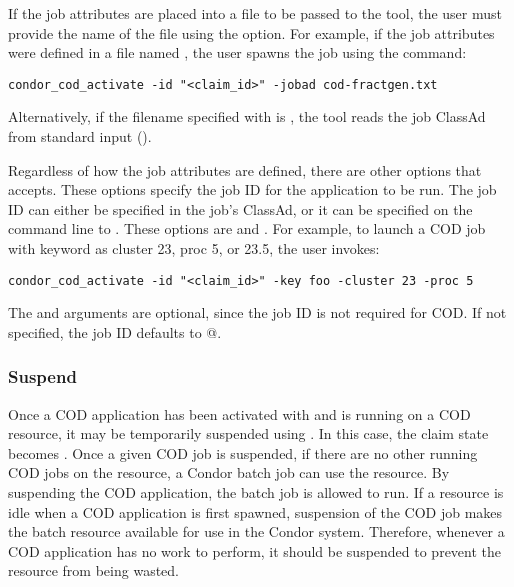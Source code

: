 If the job attributes are placed into a file to be passed to the
 tool,
the user must provide the
name of the file using the  option.
For example, if the job attributes were defined in a file named
, the user spawns the job using the
command:
\begin{verbatim}
condor_cod_activate -id "<claim_id>" -jobad cod-fractgen.txt
\end{verbatim}
Alternatively, if the filename specified with  is
\File{-}, the  tool reads the job ClassAd from
standard input ().

Regardless of how the job attributes are defined, there are
other options that  accepts.
These options specify the job ID for the application to be run.
The job ID can either be specified in the job's ClassAd, 
or it can be
specified on the command line to .
These options are  and .
For example, to launch a COD job with keyword \verb@foo@
as cluster 23, proc 5, or 23.5,
the user invokes:
\begin{verbatim}
condor_cod_activate -id "<claim_id>" -key foo -cluster 23 -proc 5
\end{verbatim}
The  and  arguments are optional,
since the job ID is not required for COD.
If not specified, the job ID defaults to @.


\subsubsection{\label{sec:cod-claim-suspend}Suspend}

Once a COD application has been activated with 
and is running on a COD resource, it may be temporarily suspended
using .
In this case, the claim state becomes \verb@Suspended@.
Once a given COD job is suspended, if there are no other running COD
jobs on the resource, a Condor batch job can use the resource.
By suspending the COD application, the batch job is allowed to run.
If a resource is idle when a COD application is first spawned,
suspension of the COD job makes the batch resource available
for use in the Condor system.
Therefore, whenever a COD application has no work to perform, it should be
suspended to prevent the resource from being wasted.

